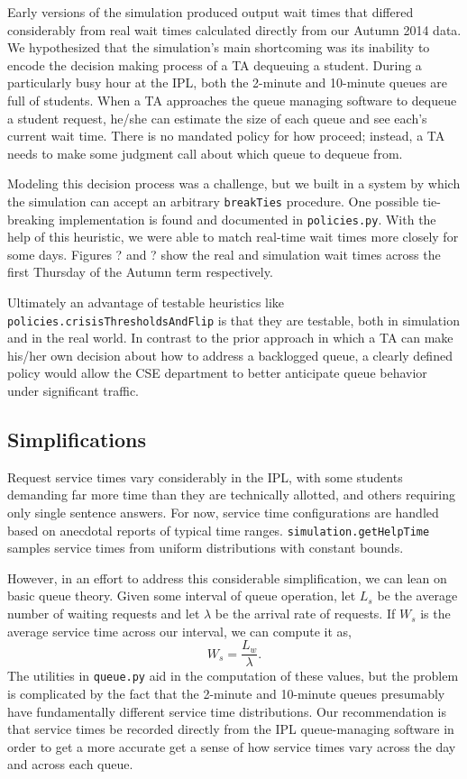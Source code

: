 \documentclass{article}
\begin{document}
\begin{multicols}{2}
Early versions of the simulation produced output wait times that differed considerably from real wait times calculated directly from our Autumn 2014 data. We hypothesized that the simulation's main shortcoming was its inability to encode the decision making process of a TA dequeuing a student. During a particularly busy hour at the IPL, both the 2-minute and 10-minute queues are full of students. When a TA approaches the queue managing software to dequeue a student request, he/she can estimate the size of each queue and see each's current wait time. There is no mandated policy for how proceed; instead, a TA needs to make some judgment call about which queue to dequeue from.

Modeling this decision process was a challenge, but we built in a system by which the simulation can accept an arbitrary \texttt{breakTies} procedure. One possible tie-breaking implementation is found and documented in \texttt{policies.py}. With the help of this heuristic, we were able to match real-time wait times more closely for some days. Figures ? and ? show the real and simulation wait times across the first Thursday of the Autumn term respectively.

Ultimately an advantage of testable heuristics like \texttt{policies.crisisThresholdsAndFlip} is that they are testable, both in simulation and in the real world. In contrast to the prior approach in which a TA can make his/her own decision about how to address a backlogged queue, a clearly defined policy would allow the CSE department to better anticipate queue behavior under significant traffic.

\subsection*{Simplifications}

Request service times vary considerably in the IPL, with some students demanding far more time than they are technically allotted, and others requiring only single sentence answers. For now, service time configurations are handled based on anecdotal reports of typical time ranges. \texttt{simulation.getHelpTime} samples service times from uniform distributions with constant bounds.

However, in an effort to address this considerable simplification, we can lean on basic queue theory. Given some interval of queue operation, let $L_s$ be the average number of waiting requests and let $\lambda$ be the arrival rate of requests. If $W_s$ is the average service time across our interval, we can compute it as,
\begin{equation}
W_s = \frac{L_w}{\lambda}.
\end{equation}
The utilities in \texttt{queue.py} aid in the computation of these values, but the problem is complicated by the fact that the 2-minute and 10-minute queues presumably have fundamentally different service time distributions. Our recommendation is that service times be recorded directly from the IPL queue-managing software in order to get a more accurate get a sense of how service times vary across the day and across each queue.


\end{multicols}
\end{document}
